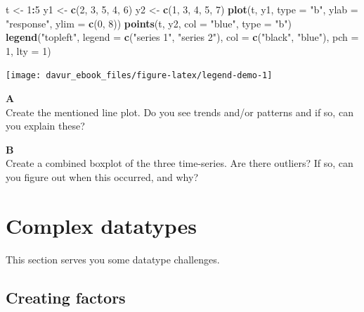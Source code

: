 \documentclass[]{book}
\newenvironment{Shaded}{\begin{snugshade}}{\end{snugshade}}
\newcommand{\DataTypeTok}[1]{\textcolor[rgb]{0.13,0.29,0.53}{#1}}
\newcommand{\DecValTok}[1]{\textcolor[rgb]{0.00,0.00,0.81}{#1}}
\newcommand{\KeywordTok}[1]{\textcolor[rgb]{0.13,0.29,0.53}{\textbf{#1}}}
\newcommand{\NormalTok}[1]{#1}
\newcommand{\OperatorTok}[1]{\textcolor[rgb]{0.81,0.36,0.00}{\textbf{#1}}}
\newcommand{\StringTok}[1]{\textcolor[rgb]{0.31,0.60,0.02}{#1}}
\begin{document}
\begin{Shaded}
\begin{Highlighting}[]
\NormalTok{t <-}\StringTok{ }\DecValTok{1}\OperatorTok{:}\DecValTok{5}
\NormalTok{y1 <-}\StringTok{ }\KeywordTok{c}\NormalTok{(}\DecValTok{2}\NormalTok{, }\DecValTok{3}\NormalTok{, }\DecValTok{5}\NormalTok{, }\DecValTok{4}\NormalTok{, }\DecValTok{6}\NormalTok{)}
\NormalTok{y2 <-}\StringTok{ }\KeywordTok{c}\NormalTok{(}\DecValTok{1}\NormalTok{, }\DecValTok{3}\NormalTok{, }\DecValTok{4}\NormalTok{, }\DecValTok{5}\NormalTok{, }\DecValTok{7}\NormalTok{)}
\KeywordTok{plot}\NormalTok{(t, y1, }\DataTypeTok{type =} \StringTok{"b"}\NormalTok{, }\DataTypeTok{ylab =} \StringTok{"response"}\NormalTok{, }\DataTypeTok{ylim =} \KeywordTok{c}\NormalTok{(}\DecValTok{0}\NormalTok{, }\DecValTok{8}\NormalTok{))}
\KeywordTok{points}\NormalTok{(t, y2, }\DataTypeTok{col =} \StringTok{"blue"}\NormalTok{, }\DataTypeTok{type =} \StringTok{"b"}\NormalTok{)}
\KeywordTok{legend}\NormalTok{(}\StringTok{"topleft"}\NormalTok{, }\DataTypeTok{legend =} \KeywordTok{c}\NormalTok{(}\StringTok{"series 1"}\NormalTok{, }\StringTok{"series 2"}\NormalTok{), }\DataTypeTok{col =} \KeywordTok{c}\NormalTok{(}\StringTok{"black"}\NormalTok{, }\StringTok{"blue"}\NormalTok{), }\DataTypeTok{pch =} \DecValTok{1}\NormalTok{, }\DataTypeTok{lty =} \DecValTok{1}\NormalTok{)}
\end{Highlighting}
\end{Shaded}

\begin{center}\texttt{[image: davur\_ebook\_files/figure-latex/legend-demo-1]} \end{center}

\textbf{A}\\
Create the mentioned line plot. Do you see trends and/or patterns and if so, can you explain these?

\textbf{B}\\
Create a combined boxplot of the three time-series. Are there outliers? If so, can you figure out when this occurred, and why?

\hypertarget{complex-datatypes}{%
\section{Complex datatypes}\label{complex-datatypes}}

This section serves you some datatype challenges.

\hypertarget{creating-factors}{%
\subsection{Creating factors}\label{creating-factors}}
\end{document}
